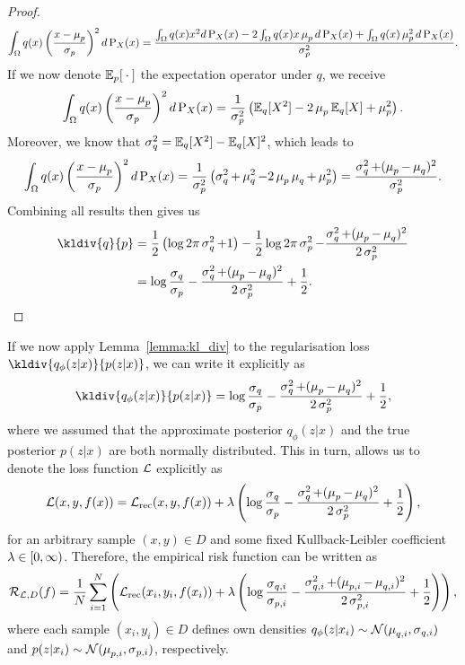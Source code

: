 \begin{proof}
\begin{align*}
\int_{\Omega} q(x) \left( \frac{x - \operatorname{\mu}_{p}}{\operatorname{\sigma}_{p}} \right)^2 d\operatorname{\text{P}}_X(x) = \frac{\int_{\Omega} q(x) x^2 d\operatorname{\text{P}}_X(x) - 2 \int_{\Omega} q(x) x\operatorname{\mu}_{p} d\operatorname{\text{P}}_X(x) + \int_{\Omega} q(x) \operatorname{\mu}_{p}^2 d\operatorname{\text{P}}_X(x)}{\operatorname{\sigma}_p^2}.
\end{align*}
If we now denote $\operatorname{\mathbb{E}}_p[{}\cdot{}]$ the expectation operator under $q$, we receive
\begin{align*}
\int_{\Omega} q(x) \left( \frac{x - \operatorname{\mu}_{p}}{\operatorname{\sigma}_{p}} \right)^2 d\operatorname{\text{P}}_X(x) = \frac{1}{\operatorname{\sigma}_p^2} \left(\operatorname{\mathbb{E}}_q[X^2] - 2 \operatorname{\mu}_p \operatorname{\mathbb{E}}_q[X] + \operatorname{\mu}_p^2 \right).
\end{align*}
Moreover, we know that $\operatorname{\sigma}_q^2 = \operatorname{\mathbb{E}}_q[X^2] - \operatorname{\mathbb{E}}_q[X]^2$, which leads to
\begin{align*}
\int_{\Omega} q(x) \left( \frac{x - \operatorname{\mu}_{p}}{\operatorname{\sigma}_{p}} \right)^2 d\operatorname{\text{P}}_X(x) = \frac{1}{\operatorname{\sigma}_p^2}\left( \operatorname{\sigma}_q^2 +\operatorname{\mu}_q^2 - 2 \operatorname{\mu}_p\operatorname{\mu}_q +\operatorname{\mu}_p^2 \right)= \frac{\operatorname{\sigma}_q^2 + (\operatorname{\mu}_p - \operatorname{\mu}_q)^2}{\operatorname{\sigma}_p^2}.
\end{align*}
Combining all results then gives us
\begin{align*}
\kldiv{q}{p} &= \frac{1}{2} \left(\log 2\pi \s_q^{2} + 1\right) - \frac{1}{2} \log 2\pi \s_p^{2} - \frac{\s_q^2 + (\m_p - \m_q)^2}{2\s_p^2}\\
&= \log \frac{\s_q}{\s_p} - \frac{\s_q^2 + (\m_p - \m_q)^2}{2\s_p^2} + \frac{1}{2}.
\end{align*}
\end{proof}

If we now apply Lemma~\ref{lemma:kl_div} to the regularisation loss $\kldiv{q_{\phi}(z|x)}{p(z|x)}$, we can write it explicitly as
\begin{align*}
\kldiv{q_{\phi}(z|x)}{p(z|x)} = \log \frac{\s_q}{\s_p} - \frac{\s_q^2 + (\m_p - \m_q)^2}{2\s_p^2} + \frac{1}{2},
\end{align*}
where we assumed that the approximate posterior $q_{\phi}(z|x)$ and the true posterior $p(z|x)$ are both normally distributed. This in turn, allows us to denote the loss function $\operatorname{\mathcal{L}}$ explicitly as
\begin{align}\label{eq:vae_loss}
\operatorname{\mathcal{L}}(x, y, f(x)) = \operatorname{\mathcal{L}}_{\text{rec}}(x, y, f(x)) + \lambda \left( \log \frac{\operatorname{\sigma}_q}{\operatorname{\sigma}_p} - \frac{\operatorname{\sigma}_q^2 + (\operatorname{\mu}_p - \operatorname{\mu}_q)^2}{2\operatorname{\sigma}_p^2} + \frac{1}{2}\right),
\end{align}
for an arbitrary sample $(x,y)\in D$ and some fixed Kullback-Leibler coefficient $\lambda\in [0,\infty)$. Therefore, the empirical risk function can be written as
\begin{align*}
\operatorname{\mathcal{R}}_{\operatorname{\mathcal{L}}, D} (f) = \frac{1}{N} \sum_{i=1}^N \left( \operatorname{\mathcal{L}}_{\text{rec}}(x_i, y_i, f(x_i)) + \lambda \left(\log \frac{\operatorname{\sigma}_{q, i}}{\operatorname{\sigma}_{p, i}} - \frac{\operatorname{\sigma}_{q, i}^2 + (\operatorname{\mu}_{p, i} - \operatorname{\mu}_{q, i})^2}{2\operatorname{\sigma}_{p, i}^2} + \frac{1}{2} \right)\right),
\end{align*}
where each sample $(x_i,y_i)\in D$ defines own densities $q_{\phi}(z|x_i)\sim \mathcal{N}(\operatorname{\mu}_{q, i}, \operatorname{\sigma}_{q, i})$ and $p(z|x_i)\sim \mathcal{N}(\operatorname{\mu}_{p, i}, \operatorname{\sigma}_{p, i})$, respectively.

